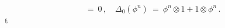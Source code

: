 \begin{equation}[ \phi_n\otimes \phi^n\,, \Delta_0(
\phi^m ) ] \ = \ 0\, ,\quad \Delta_0 ( \phi^n ) \ = \ \phi^n
\otimes 1 + 1\otimes \phi^n\,
.\label{r355}\end{equation}t
